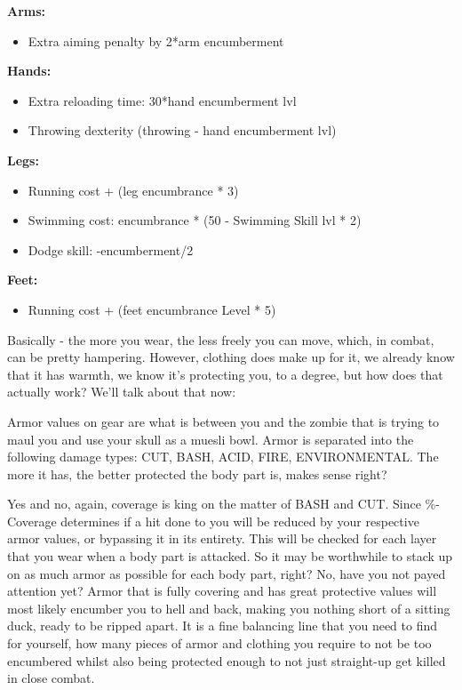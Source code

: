 \textbf{Arms:}
\begin{itemize}
\item Extra aiming penalty by 2*arm encumberment
\end{itemize}

\textbf{Hands:}
\begin{itemize}
\item Extra reloading time: 30*hand encumberment lvl
\item Throwing dexterity (throwing - hand encumberment lvl)
\end{itemize}

\textbf{Legs:}
\begin{itemize}
\item Running cost + (leg encumbrance * 3)
\item Swimming cost: encumbrance * (50 - Swimming Skill lvl * 2)
\item Dodge skill: -encumberment/2
\end{itemize}

\textbf{Feet:}
\begin{itemize}
\item Running cost + (feet encumbrance Level * 5)
\end{itemize}

Basically - the more you wear, the less freely you can move, which, in combat, can be pretty hampering. However, clothing does make up for it, we already know that it has warmth, we know it's protecting you, to a degree, but how does that actually work? We'll talk about that now:

Armor values on gear are what is between you and the zombie that is trying to maul you and use your skull as a muesli bowl. Armor is separated into the following damage types: CUT, BASH, ACID, FIRE, ENVIRONMENTAL. The more it has, the better protected the body part is, makes sense right?

Yes and no, again, coverage is king on the matter of BASH and CUT. Since \%-Coverage determines if a hit done to you will be reduced by your respective armor values, or bypassing it in its entirety. This will be checked for each layer that you wear when a body part is attacked. So it may be worthwhile to stack up on as much armor as possible for each body part, right? No, have you not payed attention yet? Armor that is fully covering and has great protective values will most likely encumber you to hell and back, making you nothing short of a sitting duck, ready to be ripped apart. It is a fine balancing line that you need to find for yourself, how many pieces of armor and clothing you require to not be too encumbered whilst also being protected enough to not just straight-up get killed in close combat.

